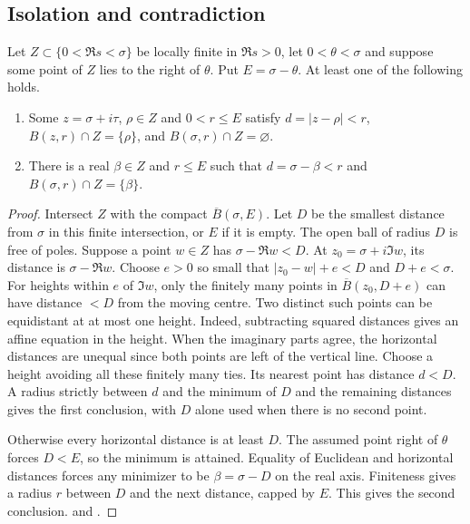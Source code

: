 \subsection{Isolation and contradiction}
\begin{lemma}\label{an:isolate}
Let \(Z\subset\{0<\Re s<\sigma\}\) be locally finite in \(\Re s>0\), let \(0<\theta<\sigma\) and suppose some point of \(Z\) lies to the right of \(\theta\). Put \(E=\sigma-\theta\). At least one of the following holds.
\begin{enumerate}
\item Some \(z=\sigma+i\tau\), \(\rho\in Z\) and \(0<r\le E\) satisfy \(d=|z-\rho|<r\), \(B(z,r)\cap Z=\{\rho\}\), and \(B(\sigma,r)\cap Z=\varnothing\).
\item There is a real \(\beta\in Z\) and \(r\le E\) such that \(d=\sigma-\beta<r\) and \(B(\sigma,r)\cap Z=\{\beta\}\).
\end{enumerate}
\end{lemma}
\begin{proof}
Intersect \(Z\) with the compact \(\overline B(\sigma,E)\). Let \(D\) be the smallest distance from \(\sigma\) in this finite intersection, or \(E\) if it is empty. The open ball of radius \(D\) is free of poles. Suppose a point \(w\in Z\) has \(\sigma-\Re w<D\). At \(z_0=\sigma+i\Im w\), its distance is \(\sigma-\Re w\). Choose \(e>0\) so small that \(|z_0-w|+e<D\) and \(D+e<\sigma\). For heights within \(e\) of \(\Im w\), only the finitely many points in \(\overline B(z_0,D+e)\) can have distance \(<D\) from the moving centre. Two distinct such points can be equidistant at at most one height. Indeed, subtracting squared distances gives an affine equation in the height. When the imaginary parts agree, the horizontal distances are unequal since both points are left of the vertical line. Choose a height avoiding all these finitely many ties. Its nearest point has distance \(d<D\). A radius strictly between \(d\) and the minimum of \(D\) and the remaining distances gives the first conclusion, with \(D\) alone used when there is no second point.

Otherwise every horizontal distance is at least \(D\). The assumed point right of \(\theta\) forces \(D<E\), so the minimum is attained. Equality of Euclidean and horizontal distances forces any minimizer to be \(\beta=\sigma-D\) on the real axis. Finiteness gives a radius \(r\) between \(D\) and the next distance, capped by \(E\). This gives the second conclusion.  and .
\end{proof}


